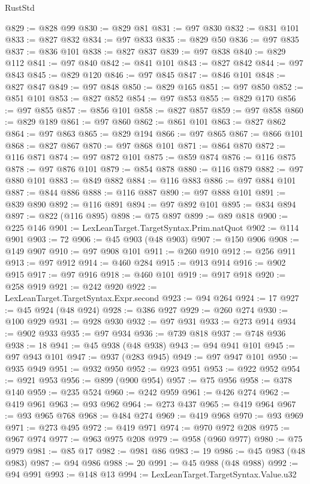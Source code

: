 \begin{lexlean}{RustStd}
\begin{coremodule}
@829 := @828 @99
@830 := @829 @81
@831 := @97 @830
@832 := @831 @101
@833 := @827 @832
@834 := @97 @833
@835 := @829 @50
@836 := @97 @835
@837 := @836 @101
@838 := @827 @837
@839 := @97 @838
@840 := @829 @112
@841 := @97 @840
@842 := @841 @101
@843 := @827 @842
@844 := @97 @843
@845 := @829 @120
@846 := @97 @845
@847 := @846 @101
@848 := @827 @847
@849 := @97 @848
@850 := @829 @165
@851 := @97 @850
@852 := @851 @101
@853 := @827 @852
@854 := @97 @853
@855 := @829 @170
@856 := @97 @855
@857 := @856 @101
@858 := @827 @857
@859 := @97 @858
@860 := @829 @189
@861 := @97 @860
@862 := @861 @101
@863 := @827 @862
@864 := @97 @863
@865 := @829 @194
@866 := @97 @865
@867 := @866 @101
@868 := @827 @867
@870 := @97 @868 @101
@871 := @864 @870
@872 := @116 @871
@874 := @97 @872 @101
@875 := @859 @874
@876 := @116 @875
@878 := @97 @876 @101
@879 := @854 @878
@880 := @116 @879
@882 := @97 @880 @101
@883 := @849 @882
@884 := @116 @883
@886 := @97 @884 @101
@887 := @844 @886
@888 := @116 @887
@890 := @97 @888 @101
@891 := @839 @890
@892 := @116 @891
@894 := @97 @892 @101
@895 := @834 @894
@897 := @822 (@116 @895)
@898 := @75 @897
@899 := @89 @818
@900 := @225 @146
@901 := LexLeanTarget.TargetSyntax.Prim.natQuot
@902 := @114 @901
@903 := 72
@906 := @45 @903 (@48 @903)
@907 := @150 @906
@908 := @149 @907
@910 := @97 @908 @101
@911 := @260 @910
@912 := @256 @911
@913 := @97 @912
@914 := @460 @284
@915 := @913 @914
@916 := @902 @915
@917 := @97 @916
@918 := @460 @101
@919 := @917 @918
@920 := @258 @919
@921 := @242 @920
@922 := LexLeanTarget.TargetSyntax.Expr.second
@923 := @94 @264
@924 := 17
@927 := @45 @924 (@48 @924)
@928 := @386 @927
@929 := @260 @274
@930 := @100 @929
@931 := @928 @930
@932 := @97 @931
@933 := @273 @914
@934 := @902 @933
@935 := @97 @934
@936 := @739 @818
@937 := @748 @936
@938 := 18
@941 := @45 @938 (@48 @938)
@943 := @94 @941 @101
@945 := @97 @943 @101
@947 := @937 (@283 @945)
@949 := @97 @947 @101
@950 := @935 @949
@951 := @932 @950
@952 := @923 @951
@953 := @922 @952
@954 := @921 @953
@956 := @899 (@900 @954)
@957 := @75 @956
@958 := @378 @140
@959 := @235 @524
@960 := @242 @959
@961 := @426 @274
@962 := @419 @961
@963 := @93 @962
@964 := @273 @437
@965 := @419 @964
@967 := @93 @965 @768
@968 := @484 @274
@969 := @419 @968
@970 := @93 @969
@971 := @273 @495
@972 := @419 @971
@974 := @970 @972 @208
@975 := @967 @974
@977 := @963 @975 @208
@979 := @958 (@960 @977)
@980 := @75 @979
@981 := @85 @17
@982 := @981 @86
@983 := 19
@986 := @45 @983 (@48 @983)
@987 := @94 @986
@988 := 20
@991 := @45 @988 (@48 @988)
@992 := @94 @991
@993 := @148 @13
@994 := LexLeanTarget.TargetSyntax.Value.u32

\end{coremodule}
\end{lexlean}
